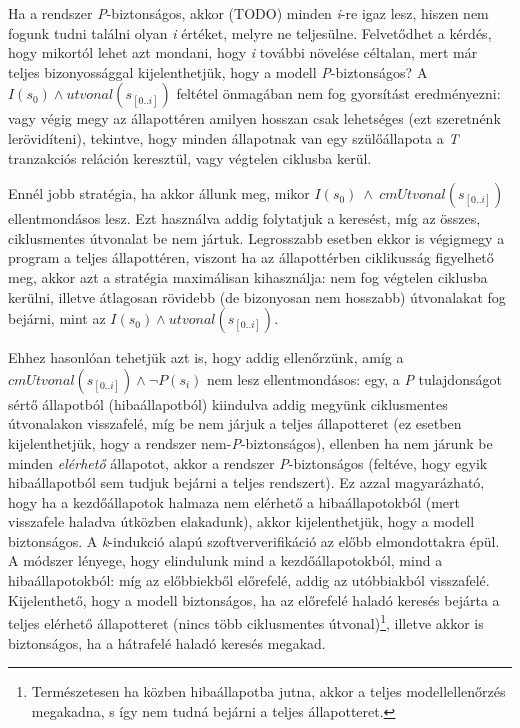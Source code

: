 Ha a rendszer \emph{P}-biztonságos, akkor (TODO) minden \emph{i}-re igaz lesz, hiszen nem fogunk tudni találni olyan \emph{i} értéket, melyre ne teljesülne. Felvetődhet a kérdés, hogy mikortól lehet azt mondani, hogy \emph{i} további növelése céltalan, mert már teljes bizonyossággal kijelenthetjük, hogy a modell \emph{P}-biztonságos? A $I(s_{0}) \wedge utvonal(s_{[0..i]})$ feltétel önmagában nem fog gyorsítást eredményezni: vagy végig megy az állapottéren amilyen hosszan csak lehetséges (ezt szeretnénk lerövidíteni), tekintve, hogy minden állapotnak van egy szülőállapota a \emph{T} tranzakciós reláción keresztül, vagy végtelen ciklusba kerül.

Ennél jobb stratégia, ha akkor állunk meg, mikor $I(s_{0})~\wedge~ cmUtvonal(s_{[0..i]})$ ellentmondásos lesz. Ezt használva addig folytatjuk a keresést, míg az összes, ciklusmentes útvonalat be nem jártuk. Legrosszabb esetben ekkor is végigmegy a program a teljes állapottéren, viszont ha az állapottérben ciklikusság figyelhető meg, akkor azt a stratégia maximálisan kihasználja: nem fog végtelen ciklusba kerülni, illetve átlagosan rövidebb (de bizonyosan nem hosszabb) útvonalakat fog bejárni, mint az $I(s_{0}) \wedge utvonal(s_{[0..i]})$.

Ehhez hasonlóan tehetjük azt is, hogy addig ellenőrzünk, amíg a $cmUtvonal(s_{[0..i]}) \wedge \neg P(s_{i})$ nem lesz ellentmondásos: egy, a \emph{P} tulajdonságot sértő állapotból (hibaállapotból) kiindulva addig megyünk ciklusmentes útvonalakon visszafelé, míg be nem járjuk a teljes állapotteret (ez esetben kijelenthetjük, hogy a rendszer nem-\emph{P}-biztonságos), ellenben ha nem járunk be minden \emph{elérhető} állapotot, akkor a rendszer \emph{P}-biztonságos (feltéve, hogy egyik hibaállapotból sem tudjuk bejárni a teljes rendszert). Ez azzal magyarázható, hogy ha a kezdőállapotok halmaza nem elérhető a hibaállapotokból (mert visszafele haladva útközben elakadunk), akkor kijelenthetjük, hogy a modell biztonságos.
\newline
\newline
A \emph{k}-indukció alapú szoftververifikáció az előbb elmondottakra épül. A módszer lényege, hogy elindulunk mind a kezdőállapotokból, mind a hibaállapotokból: míg az előbbiekből előrefelé, addig az utóbbiakból visszafelé. Kijelenthető, hogy a modell biztonságos, ha az előrefelé haladó keresés bejárta a teljes elérhető állapotteret (nincs több ciklusmentes útvonal)\footnote{Természetesen ha közben hibaállapotba jutna, akkor a teljes modellellenőrzés megakadna, s így nem tudná bejárni a teljes állapotteret.}, illetve akkor is biztonságos, ha a hátrafelé haladó keresés megakad.


